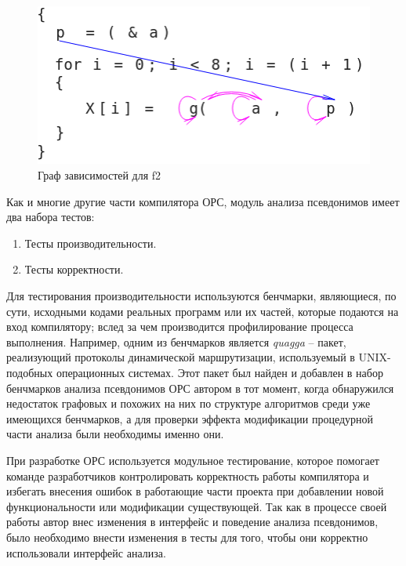 \begin{figure}[H]
\centering
\includegraphics[width=1\textwidth]{img/opsDepGraphGood_alpha.png}
\caption{Граф зависимостей для f2}
\label{fig:depgraphGood}
\end{figure}

Как и многие другие части компилятора ОРС, модуль анализа псевдонимов имеет два набора тестов:
\begin{enumerate}
    \item Тесты производительности.
    \item Тесты корректности.
\end{enumerate}

Для тестирования производительности используются бенчмарки, являющиеся, по сути, исходными кодами реальных программ или их частей, которые подаются на вход компилятору; вслед за чем производится профилирование процесса выполнения. Например, одним из бенчмарков является \textit{quagga} -- пакет, реализующий протоколы динамической маршрутизации, используемый в UNIX-подобных операционных системах. Этот пакет был найден и добавлен в набор бенчмарков анализа псевдонимов ОРС автором в тот момент, когда обнаружился недостаток графовых и похожих на них по структуре алгоритмов среди уже имеющихся бенчмарков, а для проверки эффекта модификации процедурной части анализа были необходимы именно они.

При разработке ОРС используется модульное тестирование, которое помогает команде разработчиков контролировать корректность работы компилятора и избегать внесения ошибок в работающие части проекта при добавлении новой функциональности или модификации существующей. Так как в процессе своей работы автор внес изменения в интерфейс и поведение анализа псевдонимов, было необходимо внести изменения в тесты для того, чтобы они корректно использовали интерфейс анализа.

